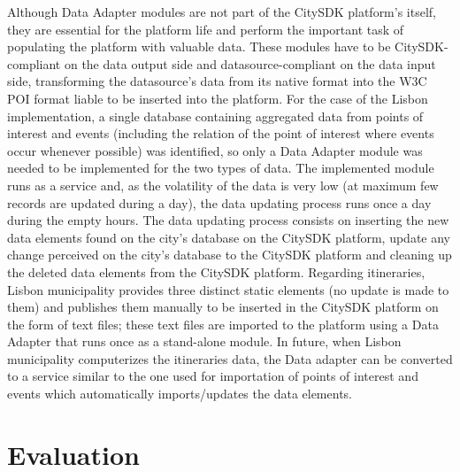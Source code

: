\documentclass[times]{ettauth}
\begin{document}
Although Data Adapter modules are not part of the CitySDK platform's itself, they are essential for the platform life and perform the important task of populating the platform with valuable data. These modules have to be CitySDK-compliant on the data output side and datasource-compliant on the data input side, transforming the datasource's data from its native format into the W3C POI format liable to be inserted into the platform. For the case of the Lisbon implementation, a single database containing aggregated data from points of interest and events (including the relation of the point of interest where events occur whenever possible) was identified, so only a Data Adapter module was needed to be implemented for the two types of data. The implemented module runs as a service and, as the volatility of the data is very low (at maximum few records are updated during a day), the data updating process runs once a day during the empty hours. The data updating process consists on inserting the new data elements found on the city's database on the CitySDK platform, update any change perceived on the city's database to the CitySDK platform and cleaning up the deleted data elements from the CitySDK platform. Regarding itineraries, Lisbon municipality provides three distinct static elements (no update is made to them) and publishes them manually to be inserted in the CitySDK platform on the form of text files; these text files are imported to the platform using a Data Adapter that runs once as a stand-alone module. In future, when Lisbon municipality computerizes the itineraries data, the Data adapter can be converted to a service similar to the one used for importation of points of interest and events which automatically imports/updates the data elements.

\section{Evaluation}
\end{document}
